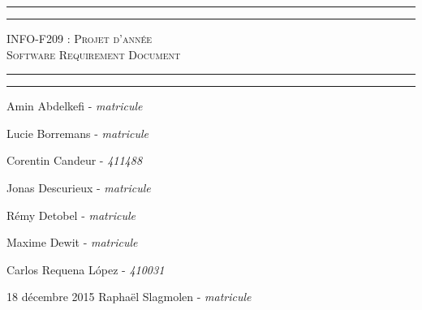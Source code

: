 \begin{titlepage}

\begin{center}
    \vspace*{\fill}
        \hrule
        \vspace*{2pt}
        \hrule
        \vspace*{15pt}
        \textsc{\Huge{INFO-F209 : Projet d'année \\\vspace*{8pt}
            Software Requirement Document}}
        \vspace*{15pt}
        \hrule
        \vspace*{2pt}
        \hrule
  \vspace*{\fill}
\end{center}
\null
\vfill

\hfill Amin Abdelkefi - \emph{matricule}

\hfill Lucie Borremans - \emph{matricule}

\hfill Corentin Candeur - \emph{411488}

\hfill Jonas Descurieux - \emph{matricule}

\hfill Rémy Detobel - \emph{matricule}

\hfill Maxime Dewit - \emph{matricule}

\hfill Carlos Requena López - \emph{410031}

\large 18 décembre 2015 \hfill Raphaël Slagmolen - \emph{matricule}

\end{titlepage}
